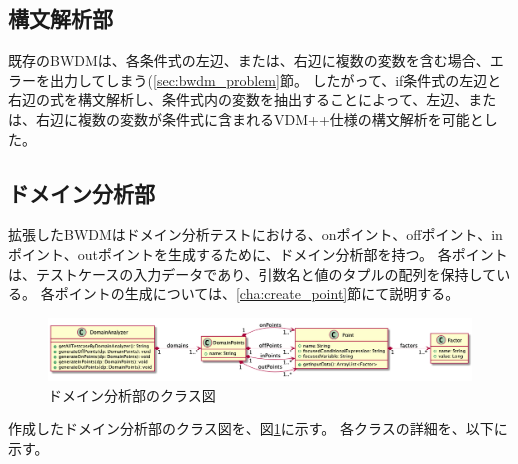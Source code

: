 \documentclass[uplatex, report, a4j, 10pt]{jsbook}
\newcommand\ttt[1]{\texttt{#1}}
\begin{document}
\subsection{構文解析部}
既存のBWDMは、各条件式の左辺、または、右辺に複数の変数を含む場合、エラーを出力してしまう(\ref{sec:bwdm_problem}節。
したがって、if条件式の左辺と右辺の式を構文解析し、条件式内の変数を抽出することによって、左辺、または、右辺に複数の変数が条件式に含まれるVDM++仕様の構文解析を可能とした。

\subsection{ドメイン分析部}\label{cha:DomainAnalyzer}
拡張したBWDMはドメイン分析テストにおける、onポイント、offポイント、inポイント、outポイントを生成するために、ドメイン分析部を持つ。
各ポイントは、テストケースの入力データであり、引数名と値のタプルの配列を保持している。
各ポイントの生成については、\ref{cha:create_point}節にて説明する。

\begin{figure}[t]
  \begin{center}
    \includegraphics[keepaspectratio, width=160mm]{figs/DomainAnalyzer.png}
    \caption{ドメイン分析部のクラス図}
    \label{fig:class_DomainAnalyzer}
  \end{center}
\end{figure}

作成したドメイン分析部のクラス図を、図\ref{fig:class_DomainAnalyzer}に示す。
各クラスの詳細を、以下に示す。

\newcommand{\forcusedConditionalExpression}{\ttt{forcusedConditionalExpression}}
\end{document}
